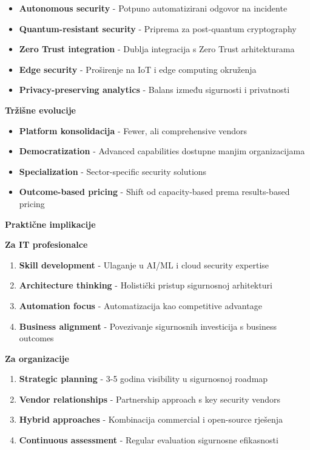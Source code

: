 \begin{itemize}
\item \textbf{Autonomous security} - Potpuno automatizirani odgovor na incidente
\item \textbf{Quantum-resistant security} - Priprema za post-quantum cryptography
\item \textbf{Zero Trust integration} - Dublja integracija s Zero Trust arhitekturama
\item \textbf{Edge security} - Proširenje na IoT i edge computing okruženja
\item \textbf{Privacy-preserving analytics} - Balans između sigurnosti i privatnosti
\end{itemize}

\textbf{Tržišne evolucije}

\begin{itemize}
\item \textbf{Platform konsolidacija} - Fewer, ali comprehensive vendors
\item \textbf{Democratization} - Advanced capabilities dostupne manjim organizacijama
\item \textbf{Specialization} - Sector-specific security solutions
\item \textbf{Outcome-based pricing} - Shift od capacity-based prema results-based pricing
\end{itemize}

\textbf{Praktične implikacije}

\textbf{Za IT profesionalce}

\begin{enumerate}
\item \textbf{Skill development} - Ulaganje u AI/ML i cloud security expertise
\item \textbf{Architecture thinking} - Holistički pristup sigurnosnoj arhitekturi
\item \textbf{Automation focus} - Automatizacija kao competitive advantage
\item \textbf{Business alignment} - Povezivanje sigurnosnih investicija s business outcomes
\end{enumerate}

\textbf{Za organizacije}

\begin{enumerate}
\item \textbf{Strategic planning} - 3-5 godina visibility u sigurnosnoj roadmap
\item \textbf{Vendor relationships} - Partnership approach s key security vendors
\item \textbf{Hybrid approaches} - Kombinacija commercial i open-source rješenja
\item \textbf{Continuous assessment} - Regular evaluation sigurnosne efikasnosti
\end{enumerate}


